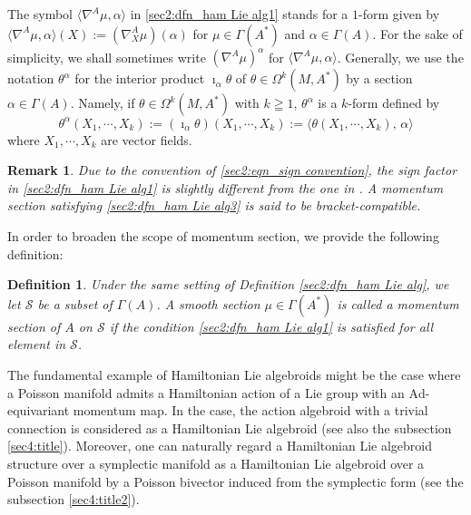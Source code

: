 \documentclass[a4paper,11pt,dvipdfmx]{article}
\newtheorem{dfn}[thm]{Definition}
\newtheorem{rmk}{Remark}[section]
\numberwithin{equation}{section}
\begin{document}
The symbol $\langle \nabla^A\mu, \alpha\rangle$ in \eqref{sec2:dfn_ham Lie alg1} stands for a $1$-form given by $\langle \nabla^A\mu, \alpha\rangle(X):=(\nabla^A_X\mu)(\alpha)$ 
for $\mu\in \varGamma(A^*)$ and $\alpha\in\varGamma(A)$. For the sake of simplicity, we shall sometimes write $(\nabla^A\mu)^{\alpha}$ for $\langle \nabla^A\mu, \alpha\rangle$. Generally, 
we use the notation $\theta^{\alpha}$ for the interior product $\imath_{\alpha}\theta$ of $\theta\in \Omega^k(M,A^*)$ by a section $\alpha\in\varGamma(A)$. Namely, if 
$\theta\in \Omega^k(M,A^*)$ with $k\geqq 1$, $\theta^{\alpha}$ is a $k$-form defined by 
\[
\theta^{\alpha}(X_1,\cdots,X_k):=(\imath_{\alpha}\theta)(X_1,\cdots,X_k):= \langle \theta(X_1,\cdots,X_k),\,\alpha\rangle 
\]
where $X_1,\cdots,X_k$ are vector fields. 

\begin{rmk}
Due to the convention of \eqref{sec2:eqn_sign convention}, the sign factor in \eqref{sec2:dfn_ham Lie alg1} is slightly different from the one in \cite{BRWham23}. 
A momentum section satisfying \eqref{sec2:dfn_ham Lie alg3} is said to be bracket-compatible. 
\end{rmk}

In order to broaden the scope of momentum section, we provide the following definition: 

\begin{dfn}
Under the same setting of Definition \ref{sec2:dfn_ham Lie alg}, we let $\mathcal{S}$ be a subset of $\varGamma(A)$. 
A smooth section $\mu\in \varGamma(A^*)$ is called a momentum section of $A$ on $\mathcal{S}$ if the condition \eqref{sec2:dfn_ham Lie alg1} is satisfied for all element in $\mathcal{S}$. 
\end{dfn}
\medskip 

The fundamental example of Hamiltonian Lie algebroids might be the case where a Poisson manifold admits a Hamiltonian action of a Lie group with an $\mathrm{Ad}$-equivariant momentum map. 
In the case, the action algebroid with a trivial connection is considered as a Hamiltonian Lie algebroid (see also the subsection \ref{sec4:title}). 
Moreover, one can naturally regard a Hamiltonian Lie algebroid structure over a symplectic manifold as a Hamiltonian Lie algebroid over a Poisson manifold by a Poisson bivector 
induced from the symplectic form (see the subsection \ref{sec4:title2}). 
\end{document}
